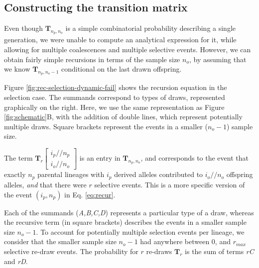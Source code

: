 \documentclass[review]{elsarticle}
\newcommand{\dslash}{/\!\!/}
\newcommand{\Coalc}[4]{\begin{bmatrix}#1\dslash #2 \\ #3\dslash #4 \end{bmatrix}}
\begin{document}
\subsection{Constructing the transition matrix}
\label{subsec:trans-mat}

Even though $\mathbf{T}_{n_p,n_o}$ is a simple combinatorial probability describing a single
generation, we were unable to compute an analytical expression for it, while allowing for multiple
coalescences and multiple selective events. However, we can obtain fairly simple recursions in terms
of the sample size $n_o$, by assuming that we know $\mathbf{T}_{n_p,n_o-1}$ conditional on the last
drawn offspring.

Figure \ref{fig:rec-selection-dynamic-fail} shows the recursion equation in the selection case. The
summands correspond to types of draws, represented graphically on the right. Here, we use the same
representation as Figure \ref{fig:schematic}B, with the addition of double lines, which represent
potentially multiple draws. Square brackets represent the events in a smaller ($n_o-1$) sample size.

The term $\mathbf{T}_{r}\Coalc{i_p}{n_p}{i_o}{n_o}$ is an entry in $\mathbf{T}_{n_p,n_o}$, and
corresponds to the event that exactly $n_p$ parental lineages with $i_p$ derived alleles contributed
to $i_o // n_o$ offspring alleles, \textit{and} that there were $r$ selective events. This is a more
specific version of the event $(i_p, n_p)$ in Eq. \ref{eq:recur}.

Each of the summands (\textit{A,B,C,D}) represents a particular type of a draw, whereas the
recursive term (in square brackets) describes the events in a smaller sample size $n_o-1$. To
account for potentially multiple selection events per lineage, we consider that the
smaller sample size $n_o-1$ had anywhere between $0$, and $r_{max}$ selective re-draw events. The
probability for $r$ re-draws $\mathbf{T}_{r}$ is the sum of terms \textit{rC} and \textit{rD}.
\end{document}

